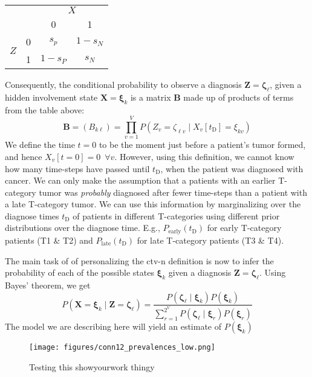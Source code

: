 \documentclass[twocolumn]{aastex631}
\begin{document}
\begin{center}
\begin{tabular}{|cc|cc|}
    \hline
    & & \multicolumn{2}{c|}{$X$} \\
    & & 0 & 1 \\
    \hline
    \multirow{2}{*}{$Z$} & 0 & $s_p$ & $1 - s_N$ \\
    & 1 & $1 - s_P$ & $s_N$ \\
    \hline
\end{tabular}
\end{center}

Consequently, the conditional probability to observe a diagnosis $\mathbf{Z}=\boldsymbol{\zeta}_\ell$, given a hidden involvement state $\mathbf{X}=\boldsymbol{\xi}_k$ is a matrix $\mathbf{B}$ made up of products of terms from the table above:
%
\begin{equation}
    \mathbf{B} = \left( B_{k\ell} \right) = \prod_{v=1}^V P\left( Z_v = \zeta_{\ell v} \mid X_v[t_\text{D}] = \xi_{kv} \right)
\end{equation}
%
We define the time $t=0$ to be the moment just before a patient's tumor formed, and hence $X_v[t=0]=0 \,\,\, \forall v$. However, using this definition, we cannot know how many time-steps have passed until $t_\text{D}$, when the patient was diagnosed with cancer. We can only make the assumption that a patients with an earlier T-category tumor was \emph{probably} diagnosed after fewer time-steps than a patient with a late T-category tumor. We can use this information by marginalizing over the diagnose times $t_\text{D}$ of patients in different T-categories using different prior distributions over the diagnose time. E.g., $P_\text{early}\left( t_\text{D} \right)$ for early T-category patients (T1 \& T2) and $P_\text{late}\left( t_\text{D} \right)$ for late T-category patients (T3 \& T4).

The main task of of personalizing the \gls{ctv-n} definition is now to infer the probability of each of the possible states $\boldsymbol{\xi}_k$ given a diagnosis $\mathbf{Z}=\boldsymbol{\zeta}_\ell$. Using Bayes' theorem, we get
%
\begin{equation}
    P\left( \mathbf{X}=\boldsymbol{\xi}_k \mid \mathbf{Z}=\boldsymbol{\zeta}_\ell \right) = \frac{P\left( \boldsymbol{\zeta}_\ell \mid \boldsymbol{\xi}_k \right) P\left( \boldsymbol{\xi}_k \right)}{\sum_{r=1}^{2^V} P\left( \boldsymbol{\zeta}_\ell \mid \boldsymbol{\xi}_r \right) P\left( \boldsymbol{\xi}_r \right) }
\end{equation}
%
The model we are describing here will yield an estimate of $P\left( \boldsymbol{\xi}_k \right)$

\begin{figure}
    \begin{centering}
        \texttt{[image: figures/conn12\_prevalences\_low.png]}
        \caption{Testing this showyourwork thingy}
        \label{fig:conn12_prevalences_low}
    \end{centering}
\end{figure}


\end{document}
